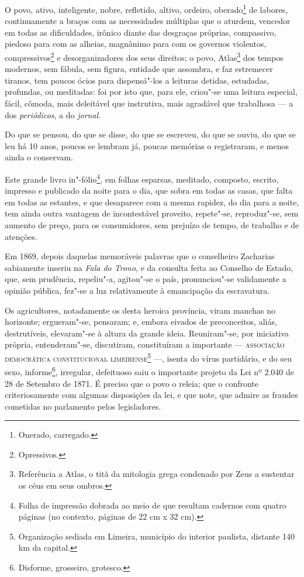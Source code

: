 O povo, ativo, inteligente, nobre, refletido, altivo, ordeiro,
oberado\footnote{Onerado, carregado.} de labores, continuamente a
braços com as necessidades múltiplas que o aturdem, vencedor em todas as
dificuldades, irônico diante das desgraças próprias, compassivo, piedoso
para com as alheias, magnânimo para com os governos violentos,
compressivos\footnote{Opressivos.} e desorganizadores dos seus
direitos; o povo, Atlas\footnote{Referência a Atlas, o titã da
  mitologia grega condenado por Zeus a sustentar os céus em seus ombros.}
dos tempos modernos, sem fábula, sem figura, entidade que assombra, e
faz estremecer tiranos, tem poucos ócios para dispensá"-los a leituras
detidas, estudadas, profundas, ou meditadas: foi por isto que, para ele,
criou"-se uma leitura especial, fácil, cômoda, mais deleitável que
instrutiva, mais agradável que trabalhosa --- a dos \emph{periódicos},
a do \emph{jornal}.

Do que se pensou, do que se disse, do que se escreveu, do que se ouviu,
do que se leu há 10 anos, poucos se lembram já, poucas memórias o
registraram, e menos ainda o conservam.

Este grande livro in"-fólio\footnote{
  Folha de impressão dobrada ao meio de que resultam cadernos com quatro páginas (no
  contexto, páginas de 22 cm x 32 cm).}, em folhas esparsas, meditado,
composto, escrito, impresso e publicado da noite para o dia, que sobra
em todas as casas, que falta em todas as estantes, e que desaparece com
a mesma rapidez, do dia para a noite, tem ainda outra vantagem de
incontestável proveito, repete"-se, reproduz"-se, sem aumento de preço,
para os consumidores, sem prejuízo de tempo, de trabalho e de atenções.

Em 1869, depois daquelas memoráveis palavras que o conselheiro Zacharias
sabiamente inseriu na \emph{Fala do Trono}, e da consulta feita ao
Conselho de Estado, que, sem prudência, repeliu"-a, agitou"-se o país,
pronunciou"-se validamente a opinião pública, fez"-se a luz relativamente
à emancipação da escravatura.

Os agricultores, notadamente os desta heroica província, viram manchas
no horizonte; ergueram"-se, pensaram; e, embora eivados de preconceitos,
aliás, destrutíveis, elevaram"-se à altura da grande ideia. Reuniram"-se,
por iniciativa própria, entenderam"-se, discutiram, constituíram a
importante --- \textsc{associação democrática constitucional
limeirense}\footnote{Organização sediada em Limeira, município do
  interior paulista, distante 140 km da capital.} ---, isenta do vírus
partidário, e do seu sexo, informe\footnote{Disforme, grosseiro,
  grotesco.}, irregular, defeituoso saiu o importante projeto da Lei nº
2.040 de 28 de Setembro de 1871. É preciso que o povo o releia; que o
confronte criteriosamente com algumas disposições da lei, e que note,
que admire as fraudes cometidas no parlamento pelos legisladores.

